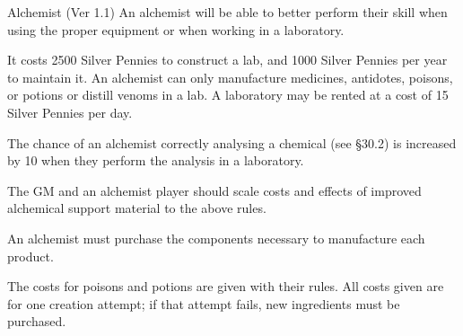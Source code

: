 \begin{Chapter}{Alchemist (Ver 1.1)}
An alchemist will be able to better perform their skill when using the
proper equipment or when working in a laboratory.

It costs 2500 Silver Pennies to construct a lab, and 1000 Silver
Pennies per year to maintain it.  An alchemist can only manufacture
medicines, antidotes, poisons, or potions or distill venoms in a lab.
A laboratory may be rented at a cost of 15 Silver Pennies per day.

The chance of an alchemist correctly analysing a chemical (see §30.2)
is increased by 10 when they perform the analysis in a laboratory.

The GM and an alchemist player should scale costs and effects of
improved alchemical support material to the above rules.

An alchemist must purchase the components necessary to manufacture
each product.

The costs for poisons and potions are given with their rules.  All
costs given are for one creation attempt; if that attempt fails, new
ingredients must be purchased.

\end{Chapter}
